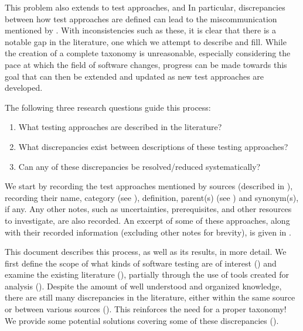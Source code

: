     This problem also extends to test approaches, and
\else
    In particular,
\fi
discrepancies between how test approaches are defined can lead to the
miscommunication mentioned by \citet[p.~7]{KanerEtAl2011}. \tourDiscrep{}
\alphaDiscrep{} \loadDiscrep{} With inconsistencies such as these, it is clear
that there is a notable gap in the literature, one which we attempt to describe
and fill. While the creation of a complete taxonomy is unreasonable, especially
considering the pace at which the field of software changes, progress can be
made towards this goal that can then be extended and updated as new test
approaches are developed.

\ifnotpaper
    The following three research questions guide this process:
    \begin{enumerate}
        \item What testing approaches are described in the literature?
        \item What discrepancies exist between descriptions of these testing
              approaches?
        \item Can any of these discrepancies be resolved/reduced systematically?
    \end{enumerate}
    We start by recording the \approachCount{} test approaches mentioned by
    \srcCount{} sources (described in ), recording their name,
    category (see ), definition, parent(s)
    (see )
    and synonym(s), if any. Any other notes, such as uncertainties,
    prerequisites, and other resources to investigate, are also recorded. An
    excerpt of some of these approaches, along with their recorded information
    (excluding other notes for brevity), is given in
    .
\fi

This document describes this process, as well as its results, in more detail.
We first define the scope of
what kinds of software testing are of interest () and examine the
existing literature ()\ifnotpaper, partially through the use
of tools created for analysis ()\fi. Despite the amount of well
understood and organized knowledge, there are still many discrepancies in the
literature, either within the same source or between various
sources (). This reinforces the need for a proper taxonomy! We
provide some potential solutions covering some of these discrepancies
().

\ifnotpaper
    \begin{bigLandscape}
        
    \end{bigLandscape}
\fi